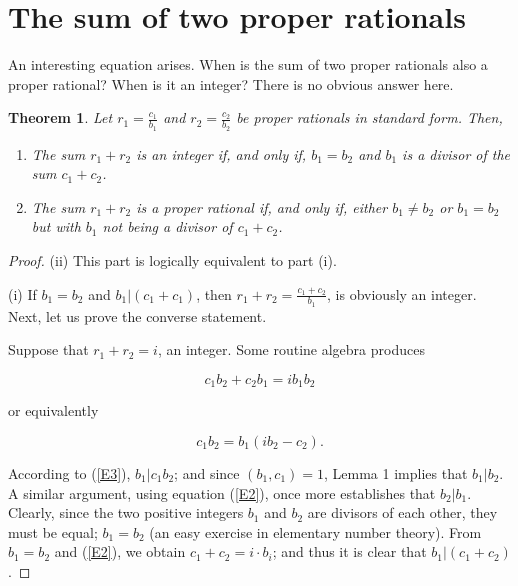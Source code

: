\documentclass[12pt]{article}
\newtheorem{theorem}{Theorem}
\begin{document}
\section{The sum of two proper rationals}

An interesting equation arises.  When is the sum of two proper rationals also
a proper rational?  When is it an integer?  There is no obvious answer here.

\begin{theorem}  Let $r_1 = \frac{c_1}{b_1}$ and $r_2 = \frac{c_2}{b_2}$ be
  proper rationals in standard form.  Then,

\begin{enumerate}
\item[(i)]  The sum $r_1 + r_2$ is an integer if, and only if, $b_1 = b_2$ and
  $b_1$ is a divisor of the sum $c_1+c_2$.

\item[(ii)]  The sum $r_1 + r_2$ is a proper rational if, and only if,
  either $b_1 \neq b_2$ or $b_1 = b_2$ but with $b_1$ not being a divisor of
  $c_1 + c_2$.
\end{enumerate}
\end{theorem}

\begin{proof}  (ii) This part is logically  equivalent to part (i).


\noindent (i) If $b_1=b_2$ and $b_1|(c_1+c_1)$, then $r_1 + r_2 =
\frac{c_1+c_2}{b_1}$, is obviously an integer.  Next, let us prove the
converse statement.  

Suppose that $r_1+r_2 = i$, an integer.  Some routine algebra produces

\begin{equation}
c_1b_2 + c_2b_1 = i b_1 b_2 \label{E2} 
\end{equation}

\noindent or equivalently

\begin{equation}
c_1b_2 = b_1(ib_2-c_2) \label{E3}.
\end{equation}

According to (\ref{E3}), $b_1|c_1b_2$; and since $(b_1,c_1)=1$, Lemma 1
implies that $b_1|b_2$.  A similar argument, using equation (\ref{E2}), once
more establishes that $b_2|b_1$.  Clearly, since the two positive integers
$b_1$ and $b_2$ are divisors of each other, they must be equal; $b_1 =b_2$
(an easy exercise in elementary number theory).  From $b_1 = b_2$ and
(\ref{E2}), we obtain $c_1+c_2 = i\cdot b_i$; and thus it is clear that
$b_1|(c_1+c_2)$. \end{proof}
\end{document}
